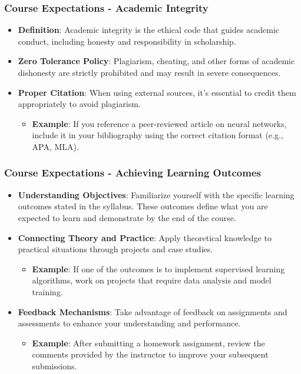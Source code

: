 \documentclass[aspectratio=169]{beamer}
\begin{document}
\begin{frame}[fragile]
    \frametitle{Course Expectations - Academic Integrity}
    \begin{itemize}
        \item \textbf{Definition}: 
        Academic integrity is the ethical code that guides academic conduct, including honesty and responsibility in scholarship.
        
        \item \textbf{Zero Tolerance Policy}: 
        Plagiarism, cheating, and other forms of academic dishonesty are strictly prohibited and may result in severe consequences.
        
        \item \textbf{Proper Citation}: 
        When using external sources, it's essential to credit them appropriately to avoid plagiarism.
        \begin{itemize}
            \item \textbf{Example}: 
            If you reference a peer-reviewed article on neural networks, include it in your bibliography using the correct citation format (e.g., APA, MLA).
        \end{itemize}
    \end{itemize}
\end{frame}

\begin{frame}[fragile]
    \frametitle{Course Expectations - Achieving Learning Outcomes}
    \begin{itemize}
        \item \textbf{Understanding Objectives}:
        Familiarize yourself with the specific learning outcomes stated in the syllabus. These outcomes define what you are expected to learn and demonstrate by the end of the course.

        \item \textbf{Connecting Theory and Practice}: 
        Apply theoretical knowledge to practical situations through projects and case studies.
        \begin{itemize}
            \item \textbf{Example}: 
            If one of the outcomes is to implement supervised learning algorithms, work on projects that require data analysis and model training.
        \end{itemize}

        \item \textbf{Feedback Mechanisms}: 
        Take advantage of feedback on assignments and assessments to enhance your understanding and performance.
        \begin{itemize}
            \item \textbf{Example}: 
            After submitting a homework assignment, review the comments provided by the instructor to improve your subsequent submissions.
        \end{itemize}
    \end{itemize}
\end{frame}
\end{document}
